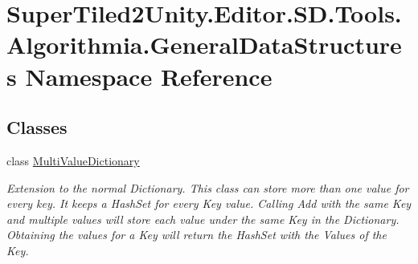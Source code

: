 \hypertarget{namespace_super_tiled2_unity_1_1_editor_1_1_s_d_1_1_tools_1_1_algorithmia_1_1_general_data_structures}{}\section{Super\+Tiled2\+Unity.\+Editor.\+S\+D.\+Tools.\+Algorithmia.\+General\+Data\+Structures Namespace Reference}
\label{namespace_super_tiled2_unity_1_1_editor_1_1_s_d_1_1_tools_1_1_algorithmia_1_1_general_data_structures}
\subsection*{Classes}
\begin{DoxyCompactItemize}
\item 
class \mbox{\hyperlink{class_super_tiled2_unity_1_1_editor_1_1_s_d_1_1_tools_1_1_algorithmia_1_1_general_data_structures_1_1_multi_value_dictionary}{Multi\+Value\+Dictionary}}
\begin{DoxyCompactList}\small\item\em Extension to the normal Dictionary. This class can store more than one value for every key. It keeps a Hash\+Set for every Key value. Calling Add with the same Key and multiple values will store each value under the same Key in the Dictionary. Obtaining the values for a Key will return the Hash\+Set with the Values of the Key. \end{DoxyCompactList}\end{DoxyCompactItemize}
